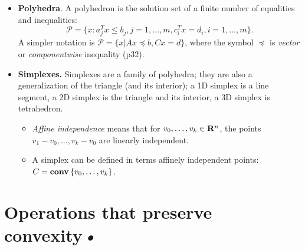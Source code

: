 \documentclass[a4paper, oneside]{book}
\begin{document}
\begin{itemize}
\item \textbf{Polyhedra}. A polyhedron is the solution set of a finite number of equalities and inequalities:
$$\mathcal P =\{ x : a_j^T x \le b_j, j=1, \hdots, m, c^T_i x= d_i, i=1,\hdots,m \}. $$
A simpler notation is $\mathcal P = \{x | Ax \preceq b, Cx = d \}$, where the symbol $\preceq$ is \textit{vector} or \textit{componentwise} inequality (p32).
\item \textbf{Simplexes.}  Simplexes are a family of polyhedra; they are also a generalization of the triangle (and its interior); \ie a 1D simplex is a line segment, a 2D simplex is the triangle and its interior, a 3D simplex is tetrahedron. 
	\begin{itemize}
	\item \textit{Affine independence} means that for $v_0, \hdots, v_k \in \mathbf R^n$, the points $v_1-v_0, \hdots, v_k-v_0$ are linearly independent.
	\item A simplex can be defined in terms affinely independent points: $C=\textbf{conv}\, \{v_0,\hdots,v_k\}$.
	\end{itemize}

\end{itemize}






\section{Operations that preserve convexity\textsl{•}}
\end{document}
